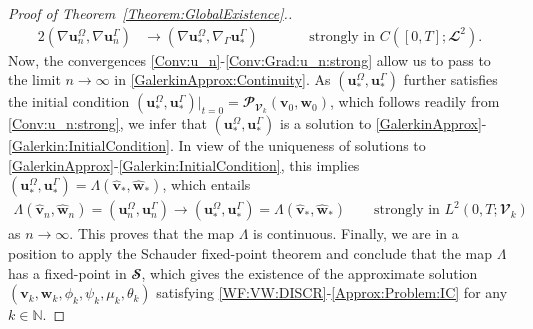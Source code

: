\documentclass[10pt,reqno]{amsart}
\theoremstyle{remark}
\numberwithin{equation}{section}
\newcommand{\N}{\mathbb N}
\newcommand{\bv}{\mathbf{v}}
\newcommand{\bu}{\mathbf{u}}
\newcommand{\bw}{\mathbf{w}}
\newcommand{\ww}{\widehat{\bw}}
\newcommand{\wv}{\widehat{\bv}}
\newcommand{\Grad}{\nabla}
\newcommand{\Gradg}{\nabla_\Ga}
\newcommand{\Om}{\Omega}
\newcommand{\Ga}{\Gamma}
\begin{document}
\begin{proof}[Proof of Theorem~\ref{Theorem:GlobalExistence}.]
\begin{alignat}{2}
        (\Grad\bu^\Om_n,\Grad\bu^\Ga_n) &\rightarrow (\Grad\bu^\Om_\ast,\Gradg\bu^\Ga_\ast) &&\qquad\text{strongly in~} C([0,T];\mathbfcal{L}^2). \label{Conv:Grad:u_n:strong}
\end{alignat}
Now, the convergences \eqref{Conv:u_n}-\eqref{Conv:Grad:u_n:strong} allow us to pass to the limit $n\rightarrow\infty$ in \eqref{GalerkinApprox:Continuity}. As $(\bu^\Om_\ast,\bu^\Ga_\ast)$ further satisfies the initial condition $(\bu^\Om_\ast,\bu^\Ga_\ast)\vert_{t=0} = \mathbfcal{P}_{\mathbfcal{V}_k}(\bv_0,\bw_0)$, which follows readily from \eqref{Conv:u_n:strong}, we infer that $(\bu^\Om_\ast,\bu^\Ga_\ast)$ is a solution to \eqref{GalerkinApprox}-\eqref{Galerkin:InitialCondition}. In view of the uniqueness of solutions to \eqref{GalerkinApprox}-\eqref{Galerkin:InitialCondition}, this implies $(\bu^\Om_\ast,\bu^\Ga_\ast) = \Lambda(\wv_\ast,\ww_\ast)$, which entails
\begin{align*}
    \Lambda(\wv_n,\ww_n) = (\bu^\Om_n,\bu^\Ga_n)
    \rightarrow 
    (\bu^\Om_\ast, \bu^\Ga_\ast) = \Lambda(\wv_\ast,\ww_\ast)
    \qquad\text{strongly in~} L^2(0,T;\mathbfcal{V}_k)
\end{align*}
as $n\rightarrow\infty$.
This proves that the map $\Lambda$ is continuous. 
Finally, we are in a position to apply the Schauder fixed-point theorem and conclude that the map $\Lambda$ has a fixed-point in $\mathbfcal{S}$, which gives the existence of the approximate solution $(\bv_k,\bw_k,\phi_k,\psi_k,\mu_k,\theta_k)$ satisfying \eqref{WF:VW:DISCR}-\eqref{Approx:Problem:IC} for any $k\in\N$.


\end{proof}
\end{document}
